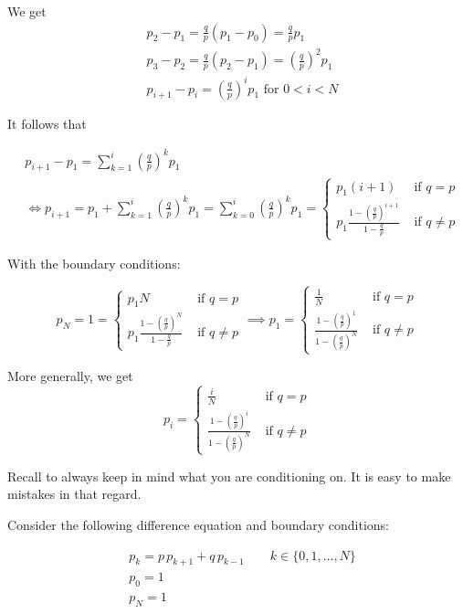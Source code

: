 \documentclass{article}
\theoremstyle{definition}
\begin{document}
We get
\begin{align*}
&p_2 - p_1 = \tfrac{q}{p} \left( p_1 - p_{0} \right) =  \tfrac{q}{p} p_1 \\
&p_3 - p_2 =  \tfrac{q}{p} \left(p_2 - p_1 \right) = \left( \tfrac{q}{p} \right)^2 p_1 \\
&p_{i+1}-p_i = \left( \tfrac{q}{p} \right)^i p_1 \text{ for } 0 < i < N
\end{align*}

It follows that

\begin{align*}
&p_{i+1} - p_1 = \sum_{k=1}^i \left( \tfrac{q}{p} \right)^k p_1 \\
&\iff p_{i+1} = p_1 + \sum_{k=1}^i \left( \tfrac{q}{p} \right)^k p_1 = \sum_{k=0}^i \left( \tfrac{q}{p} \right)^k p_1 = \begin{cases} p_1 (i+1) & \text{ if } q = p \\
p_1 \frac{1-\left( \tfrac{q}{p} \right)^{i+1}}{1-\tfrac{q}{p}} & \text{ if } q \ne p\end{cases}
\end{align*}

With the boundary conditions:

$$
p_N = 1 = \begin{cases} p_1 N & \text{ if } q = p \\
p_1 \frac{1-\left( \tfrac{q}{p} \right)^{N}}{1-\tfrac{q}{p}} & \text{ if } q \ne p\end{cases} \implies p_1 = \begin{cases} \frac{1}{N} & \text{ if } q = p \\
 \frac{1-\left( \tfrac{q}{p} \right)^{1}}{1-\left( \tfrac{q}{p} \right)^N} & \text{ if } q \ne p\end{cases}
$$

More generally, we get
$$
 p_i = \begin{cases} \frac{i}{N} & \text{ if } q = p \\
 \frac{1-\left( \tfrac{q}{p} \right)^{i}}{1-\left( \tfrac{q}{p} \right)^N} & \text{ if } q \ne p\end{cases}
$$

Recall to always keep in mind what you are conditioning on. It is easy to make mistakes in that regard.

Consider the following difference equation and boundary conditions:

\begin{align*}
&p_k = p \, p_{k+1}  + q \, p_{k-1} \qquad k \in \{0, 1, \ldots, N\}\\
&p_0 = 1 \\
&p_N = 1\\
\end{align*}
\end{document}
